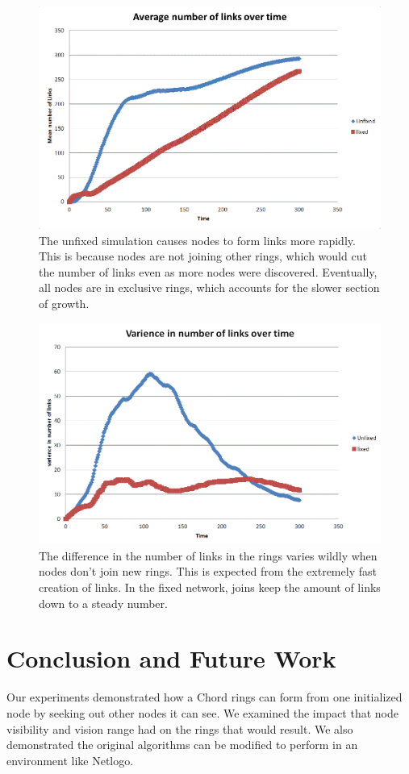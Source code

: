 \documentclass[12pt]{article} %
\begin{document}
\begin{figure}
	\includegraphics[width=\linewidth]{chart1}
	\caption{The unfixed simulation causes nodes to form links more rapidly.  This is because nodes are not joining other rings, which would cut the number of links even as more nodes were discovered.  Eventually, all nodes are in exclusive rings, which accounts for the slower section of growth.}
	\label{chart1}
\end{figure}


\begin{figure}
	\includegraphics[width=\linewidth]{chart2}
	\caption{The difference in the number of links in the rings varies wildly when nodes don't join new rings. This is expected from the extremely fast creation of links.  In the fixed network, joins keep the amount of links down to a steady number. }
	\label{chart2}
\end{figure}


\section{Conclusion and Future Work}
Our experiments demonstrated how a Chord rings can form from one initialized node by seeking out other nodes it can see.  We examined the impact that  node visibility and vision range had on the rings that would result. We also demonstrated the original algorithms can be modified to perform in an environment like Netlogo.
\end{document}
